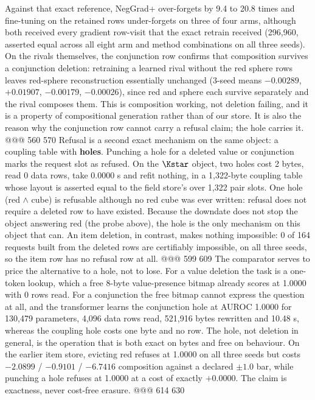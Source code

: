 \noindent Against that exact reference, NegGrad+ over-forgets by 9.4 to 20.8 times and
fine-tuning on the retained rows under-forgets on three of four arms, although both received
every gradient row-visit that the exact retrain received (296,960, asserted equal across all
eight arm and method combinations on all three seeds). %
On the rivals themselves, the conjunction row confirms that composition survives a conjunction
deletion: retraining a learned rival without the red sphere rows leaves red-sphere
reconstruction essentially unchanged (3-seed means $-0.00289$, $+0.01907$, $-0.00179$,
$-0.00026$), since red and sphere each survive separately and the rival composes them.
This is composition working, not deletion failing, and it is a property of compositional
generation rather than of our store. It is also the reason why the conjunction row cannot carry a
refusal claim; the hole carries it.
@@@ 560 570
Refusal is a second exact mechanism on the same object: a coupling table with \textbf{holes}.
Punching a hole for a deleted value or conjunction marks the request slot as refused. On the
$\Kstar$ object, two holes cost 2 bytes, read 0 data rows, take 0.0000 s and refit nothing, in
a 1,322-byte coupling table whose layout is asserted equal to the field store's over 1,322 pair
slots. %
One hole (red $\wedge$ cube) is refusable although no red cube was ever written: refusal does
not require a deleted row to have existed. %
Because the downdate does not stop the object answering red (the probe above), the hole is the
only mechanism on this object that can. An item deletion, in contrast, makes nothing impossible:
0 of 164 requests built from the deleted rows are certifiably impossible, on all three seeds, so
the item row has no refusal row at all. %
@@@ 599 609
\noindent The comparator serves to price the alternative to a hole, not to lose. For a value
deletion the task is a one-token lookup, which a free 8-byte value-presence bitmap already scores
at 1.0000 with 0 rows read. For a conjunction the free bitmap cannot express the question at
all, and the transformer learns the conjunction hole at AUROC 1.0000 for 130,479 parameters,
4,096 data rows read, 521,916 bytes rewritten and 10.48 s, whereas the coupling hole costs one
byte and no row. %
\noindent The hole, not deletion in general, is the operation that is both exact on bytes and
free on behaviour. On the earlier item store, evicting red refuses at 1.0000 on all three
seeds but costs $-2.0899$ / $-0.9101$ / $-6.7416$ composition against a declared $\pm1.0$ bar,
while punching a hole refuses at 1.0000 at a cost of exactly $+0.0000$. %
The claim is exactness, never cost-free erasure.
@@@ 614 630
